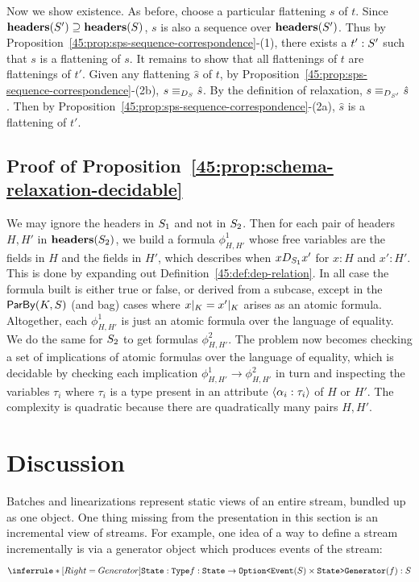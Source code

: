 Now we show existence.
As before, choose a particular flattening $s$ of $t$.
Since $\headers(\ss') \supseteq \headers(\ss)$,
$s$ is also a sequence over $\headers(\ss')$.
Thus by Proposition~\ref{45:prop:sps-sequence-correspondence}-(1),
there exists a $t': \ss'$ such that $s$ is a flattening
of $s$.
It remains to show that all flattenings of $t$ are flattenings of $t'$.
Given any flattening $\hat{s}$ of $t$,
by Proposition~\ref{45:prop:sps-sequence-correspondence}-(2b),
$s \equiv_{D_{\ss}} \hat{s}$.
By the definition of relaxation,
$s \equiv_{D_{\ss'}} \hat{s}$.
Then by Proposition~\ref{45:prop:sps-sequence-correspondence}-(2a),
$\hat{s}$ is a flattening of $t'$.

\subsection*{Proof of Proposition~\ref{45:prop:schema-relaxation-decidable}}

We may ignore the headers in $\ss_1$ and not in $\ss_2$.
Then for each pair of headers $H, H'$ in $\headers(\ss_2)$,
we build a formula $\phi^1_{H, H'}$ whose free variables are the fields
in $H$ and the fields in $H'$,
which describes when
$x D_{\ss_1} x'$ for $x : H$ and $x' : H'$.
This is done by expanding out Definition~\ref{45:def:dep-relation}.
In all case the formula built is either true or false, or derived
from a subcase,
except in the $\keyby{K}{S}$ (and bag) cases where
$\tuprestrict{x}{K} = \tuprestrict{x'}{K}$ arises as an atomic
formula.
Altogether, each $\phi^1_{H, H'}$ is just an atomic formula over the
language of equality.
We do the same for $\ss_2$ to get formulas $\phi^2_{H, H'}$.
The problem now becomes checking a set of implications
of atomic formulas over the language of equality, which is
decidable by checking each implication
$\phi^1_{H, H'} \to \phi^2_{H, H'}$
in turn
and inspecting the variables $\tau_i$ where $\tau_i$ is
a type present in an attribute $\hdrfield{\alpha_i}{\tau_i}$ of $H$ or $H'$.
The complexity is quadratic because there are quadratically many pairs $H, H'$.

\section{Discussion}

Batches and linearizations represent static views of an entire stream, bundled up as one object.
One thing missing from the presentation in this section is an incremental view of streams.
For example, one idea of a way to define a stream incrementally is via a generator object which produces events of the stream:
\[
\inference[Generator]
{
  \texttt{State}: \texttt{Type} \\
  f: \texttt{State} \to \texttt{Option<}\texttt{Event}(S) \times \texttt{State>}
}
{
  \texttt{Generator}(f): S
}
\]

